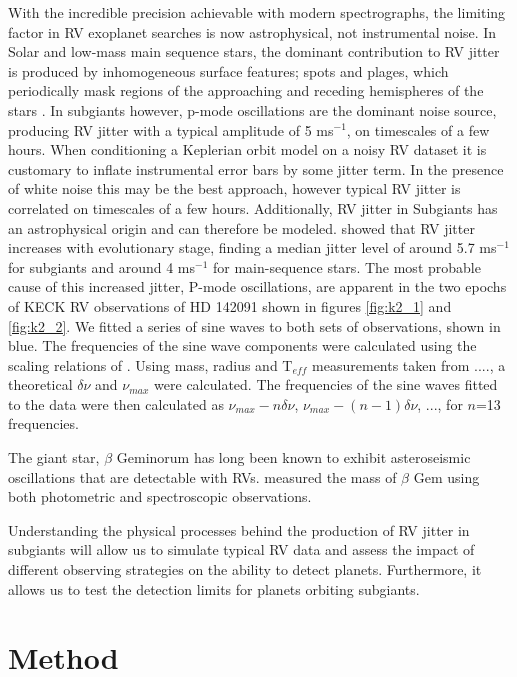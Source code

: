 \documentclass[useAMS, usenatbib]{aastex}
\begin{document}
With the incredible precision achievable with modern spectrographs, the
limiting factor in RV exoplanet searches is now astrophysical, not
instrumental noise.
In Solar and low-mass main sequence stars, the dominant contribution to RV
jitter is produced by inhomogeneous surface features; spots and plages, which
periodically mask regions of the approaching and receding hemispheres of the
stars \citep{Aigrain2012, Dumusque2011, Haywood2014}.
In subgiants however, p-mode oscillations are the dominant noise
source, producing RV jitter with a typical amplitude of 5 ms$^{-1}$, on
timescales of a few hours.
When conditioning a Keplerian orbit model on a noisy RV dataset it is
customary to inflate instrumental error bars by some jitter term. In the
presence of white noise this may be the best approach, however typical RV
jitter is correlated on timescales of a few hours.
Additionally, RV jitter in Subgiants has an astrophysical origin and
can therefore be modeled.
\citep{Wright2005} showed that RV jitter increases with evolutionary stage,
finding a median jitter level of around 5.7 ms$^{-1}$ for subgiants and around
4 ms$^{-1}$ for main-sequence stars.
The most probable cause of this increased jitter, P-mode oscillations,
are apparent in the two epochs of KECK RV observations of
HD 142091 shown in figures \ref{fig:k2_1} and \ref{fig:k2_2}.
We fitted a series of sine waves to both sets of observations, shown in blue.
The frequencies of the sine wave components were calculated using the scaling
relations of \citep{Kjeldsen1995}.
Using mass, radius and T$_{eff}$ measurements taken from ...., a theoretical
$\delta \nu$ and $\nu_{max}$ were calculated.
The frequencies of the sine waves fitted to the data were then calculated as
$\nu_{max}-n\delta \nu$, $\nu_{max}-(n-1)\delta \nu$, ..., for $n$=13
frequencies.

The giant star, $\beta$ Geminorum has long been known to exhibit asteroseismic oscillations that are detectable with RVs.
\citep{Hatzes2012} measured the mass of $\beta$ Gem using both photometric and
spectroscopic observations.

Understanding the physical processes behind the production of RV jitter in
subgiants will allow us to simulate typical RV data and assess the impact of
different observing strategies on the ability to detect planets.
Furthermore, it allows us to test the detection limits for planets orbiting
subgiants.

\section{Method}
\label{method}
\end{document}
